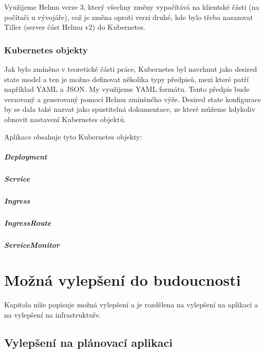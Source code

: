 \documentclass[thesis=M,czech]{FITthesis}[2019/12/23]
\theoremstyle{plain}
\theoremstyle{definition}
\begin{document}
Využijeme Helmu verze 3, který všechny změny vypočítává na klientské části (na počítači u vývojáře), což je změna oproti verzi druhé, kde bylo třeba nasazovat Tiller (server část Helmu v2) do Kubernetes.

\subsection{Kubernetes objekty}


Jak bylo zmíněno v teoretické části práce, Kubernetes byl navrhnut jako desired state model a ten je možno definovat několika typy předpisů, mezi které patří například YAML a JSON. My využijeme YAML formátu. Tento předpis bude verzovaný a generovaný pomocí Helmu zmíněného výše. Desired state konfigurace by se dala také nazvat jako spustitelná dokumentace, ze které můžeme kdykoliv obnovit nastavení Kubernetes objektů. 

Aplikace obsahuje tyto Kubernetes objekty:

\paragraph{Deployment}
\paragraph{Service}
\paragraph{Ingress}
\paragraph{IngressRoute}
\paragraph{ServiceMonitor}


\chapter{Možná vylepšení do budoucnosti}
Kapitola níže popisuje možná vylepšení a je rozdělena na vylepšení na aplikaci a na vylepšení na infrastruktuře.

\section{Vylepšení na plánovací aplikaci}
\end{document}
